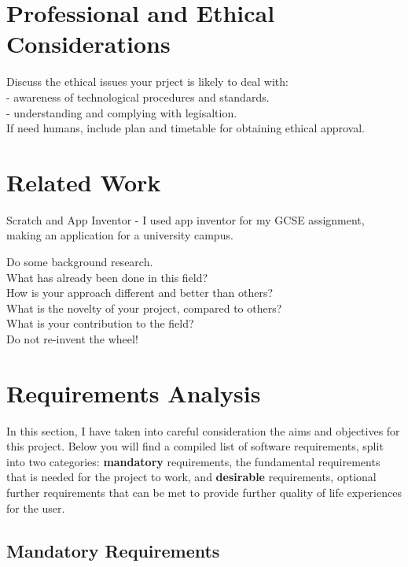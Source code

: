 \documentclass[a4paper, 12pt]{article}
\begin{document}
    \section{Professional and Ethical Considerations}
        Discuss the ethical issues your prject is likely to deal with: \\
        - awareness of technological procedures and standards. \\
        - understanding and complying with legisaltion. \\
        If need humans, include plan and timetable for obtaining ethical approval.

    \section{Related Work}
        Scratch and App Inventor - I used app inventor for my GCSE assignment, making an application for a university campus.

        Do some background research. \\
        What has already been done in this field? \\
        How is your approach different and better than others? \\
        What is the novelty of your project, compared to others? \\
        What is your contribution to the field? \\
        Do not re-invent the wheel! \\

    \clearpage
    \section{Requirements Analysis}
        In this section, I have taken into careful consideration the aims and objectives for this
        project. Below you will find a compiled list of software requirements, split into two
        categories: \textbf{mandatory} requirements, the fundamental requirements that is needed
        for the project to work, and \textbf{desirable} requirements, optional further requirements
        that can be met to provide further quality of life experiences for the user.

        \subsection{Mandatory Requirements}
\end{document}
